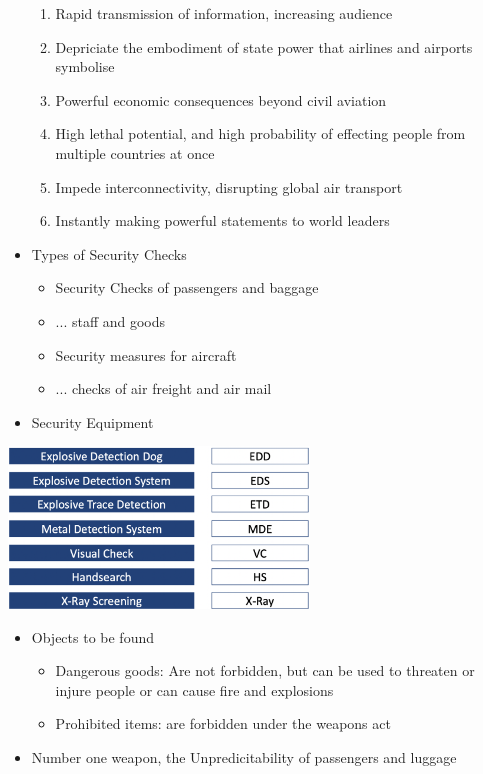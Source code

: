 \documentclass[9pt, landscape, fleqn]{scrartcl}
\begin{document}
\begin{multicols*}{3}
\begin{itemize}
\begin{enumerate}
        \item Rapid transmission of information, increasing audience
        \item Depriciate the embodiment of state power that airlines and airports symbolise 
        \item Powerful economic consequences beyond civil aviation 
        \item High lethal potential, and high probability of effecting people from multiple countries at once 
        \item Impede interconnectivity, disrupting global air transport 
        \item Instantly making powerful statements to world leaders  
    \end{enumerate}
    \item Types of Security Checks 
    \begin{itemize}
        \item Security Checks of passengers and baggage 
        \item ... staff and goods 
        \item Security measures for aircraft 
        \item ... checks of air freight and air mail 
        \end{itemize}
    \item Security Equipment 
\end{itemize}
\begin{center}
    \includegraphics[width=8cm]{Images/Security Equipment.png}
\end{center}
\begin{itemize}
    \item Objects to be found
    \begin{itemize}
        \item Dangerous goods: Are not forbidden, but can be used to threaten or injure people or can cause fire and explosions
        \item Prohibited items: are forbidden under the weapons act 
    \end{itemize}
    \item Number one weapon, the Unpredicitability of passengers and luggage 

\end{itemize}
\end{multicols*}
\end{document}
